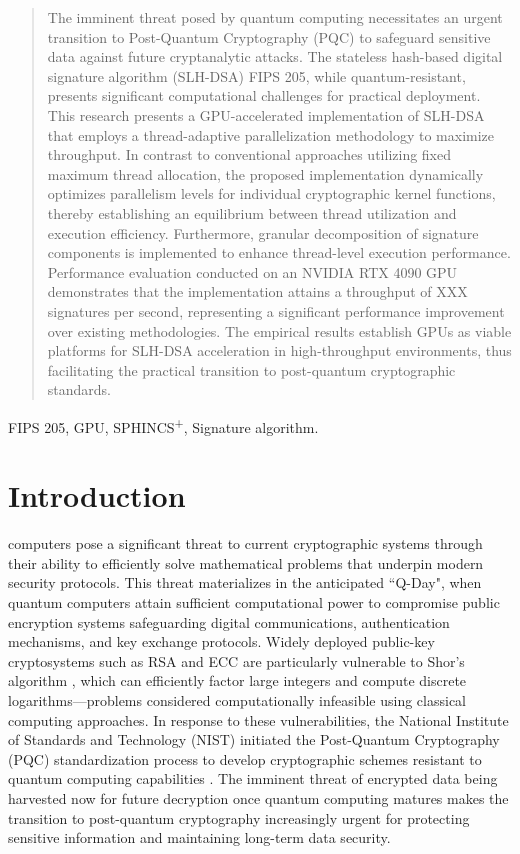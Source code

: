 \documentclass[journal]{IEEEtran}
\begin{document}
\begin{abstract}
  The imminent threat posed by quantum computing necessitates an urgent transition to Post-Quantum Cryptography (PQC) to safeguard sensitive data against future cryptanalytic attacks.
  The stateless hash-based digital signature algorithm (SLH-DSA) FIPS 205, while quantum-resistant, presents significant computational challenges for practical deployment.
  This research presents a GPU-accelerated implementation of SLH-DSA that employs a thread-adaptive parallelization methodology to maximize throughput.
  In contrast to conventional approaches utilizing fixed maximum thread allocation, the proposed implementation dynamically optimizes parallelism levels for individual cryptographic kernel functions, thereby establishing an equilibrium between thread utilization and execution efficiency.
  Furthermore, granular decomposition of signature components is implemented to enhance thread-level execution performance.
  Performance evaluation conducted on an NVIDIA RTX 4090 GPU demonstrates that the implementation attains a throughput of XXX signatures per second, representing a significant performance improvement over existing methodologies.
  The empirical results establish GPUs as viable platforms for SLH-DSA acceleration in high-throughput environments, thus facilitating the practical transition to post-quantum cryptographic standards.

\end{abstract}

\begin{IEEEkeywords}
  FIPS 205, GPU, SPHINCS\textsuperscript{+}, Signature algorithm.
\end{IEEEkeywords}

\section{Introduction}
\label{sec:intro}

 computers pose a significant threat to current cryptographic systems through their ability to efficiently solve mathematical problems that underpin modern security protocols. This threat materializes in the anticipated ``Q-Day", when quantum computers attain sufficient computational power to compromise public encryption systems safeguarding digital communications, authentication mechanisms, and key exchange protocols. Widely deployed public-key cryptosystems such as RSA and ECC are particularly vulnerable to Shor's algorithm \cite{Shor1994}, which can efficiently factor large integers and compute discrete logarithms—problems considered computationally infeasible using classical computing approaches. In response to these vulnerabilities, the National Institute of Standards and Technology (NIST) initiated the Post-Quantum Cryptography (PQC) standardization process to develop cryptographic schemes resistant to quantum computing capabilities \cite{NIST2016}. The imminent threat of encrypted data being harvested now for future decryption once quantum computing matures makes the transition to post-quantum cryptography increasingly urgent for protecting sensitive information and maintaining long-term data security.
\end{document}
